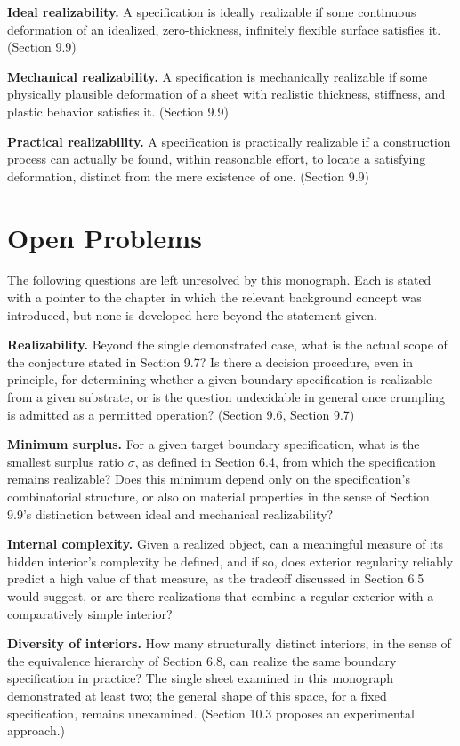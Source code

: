 \documentclass[11pt,oneside]{book}
\begin{document}
\textbf{Ideal realizability.} A specification is ideally realizable if
some continuous deformation of an idealized, zero-thickness, infinitely
flexible surface satisfies it. (Section 9.9)

\textbf{Mechanical realizability.} A specification is mechanically
realizable if some physically plausible deformation of a sheet with
realistic thickness, stiffness, and plastic behavior satisfies it.
(Section 9.9)

\textbf{Practical realizability.} A specification is practically
realizable if a construction process can actually be found, within
reasonable effort, to locate a satisfying deformation, distinct from the
mere existence of one. (Section 9.9)

\hypertarget{appendix-c.-open-problems}{%
\chapter{Open Problems}\label{appendix-c.-open-problems}}

The following questions are left unresolved by this monograph. Each is
stated with a pointer to the chapter in which the relevant background
concept was introduced, but none is developed here beyond the statement
given.

\textbf{Realizability.} Beyond the single demonstrated case, what is the
actual scope of the conjecture stated in Section 9.7? Is there a
decision procedure, even in principle, for determining whether a given
boundary specification is realizable from a given substrate, or is the
question undecidable in general once crumpling is admitted as a
permitted operation? (Section 9.6, Section 9.7)

\textbf{Minimum surplus.} For a given target boundary specification,
what is the smallest surplus ratio \(\sigma\), as defined in Section
6.4, from which the specification remains realizable? Does this minimum
depend only on the specification's combinatorial structure, or also on
material properties in the sense of Section 9.9's distinction between
ideal and mechanical realizability?

\textbf{Internal complexity.} Given a realized object, can a meaningful
measure of its hidden interior's complexity be defined, and if so, does
exterior regularity reliably predict a high value of that measure, as
the tradeoff discussed in Section 6.5 would suggest, or are there
realizations that combine a regular exterior with a comparatively simple
interior?

\textbf{Diversity of interiors.} How many structurally distinct
interiors, in the sense of the equivalence hierarchy of Section 6.8, can
realize the same boundary specification in practice? The single sheet
examined in this monograph demonstrated at least two; the general shape
of this space, for a fixed specification, remains unexamined. (Section
10.3 proposes an experimental approach.)
\end{document}
